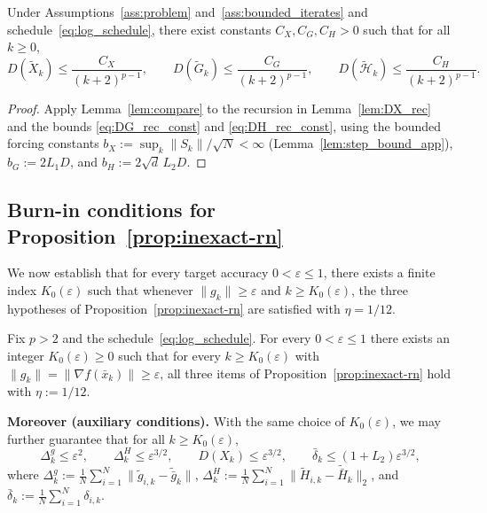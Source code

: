 \documentclass[review,onefignum,onetabnum]{siamart171218}
\begin{document}
	\begin{proposition}\label{prop:dispersion_decay}
		Under Assumptions~\ref{ass:problem} and~\ref{ass:bounded_iterates}
		and schedule~\eqref{eq:log_schedule},
		there exist constants $C_X,C_G,C_H>0$ such that for all $k\ge0$,
		\[
		D(\tilde X_k)\le \frac{C_X}{(k+2)^{p-1}},
		\qquad
		D(\tilde G_k)\le \frac{C_G}{(k+2)^{p-1}},
		\qquad
		D(\tilde{\mathcal H}_k)\le \frac{C_H}{(k+2)^{p-1}}.
		\]
	\end{proposition}
	\begin{proof}
		Apply Lemma~\ref{lem:compare} to the recursion in Lemma~\ref{lem:DX_rec} and the bounds \eqref{eq:DG_rec_const} and \eqref{eq:DH_rec_const},
		using the bounded forcing constants $b_X:=\sup_k\|S_k\|/\sqrt N<\infty$ (Lemma~\ref{lem:step_bound_app}),
		$b_G:=2L_1D$, and $b_H:=2\sqrt d\,L_2D$.
	\end{proof}
	
	\subsection{Burn-in conditions for Proposition~\ref{prop:inexact-rn}}
	
	We now establish that for every target accuracy $0<\varepsilon\le1$, there
	exists a finite index $K_0(\varepsilon)$ such that whenever
	$\|g_k\|\ge\varepsilon$ and $k\ge K_0(\varepsilon)$,
	the three hypotheses of Proposition~\ref{prop:inexact-rn} are
	satisfied with $\eta=1/12$.
	\begin{proposition}\label{prop:burnin}
		Fix $p>2$ and the schedule~\eqref{eq:log_schedule}.
		For every $0<\varepsilon\le1$ there exists an integer $K_0(\varepsilon)\ge0$ such that
		for every $k\ge K_0(\varepsilon)$ with $\|g_k\|=\|\nabla f(\bar x_k)\|\ge \varepsilon$,
		all three items of Proposition~\ref{prop:inexact-rn} hold with $\eta:=1/12$.
		
		\smallskip
		\noindent\textbf{Moreover (auxiliary conditions).}
		With the same choice of $K_0(\varepsilon)$, we may further guarantee that for all $k\ge K_0(\varepsilon)$,
		\begin{equation}\label{eq:burnin_aux_enforce}
			\Delta_k^g \le \varepsilon^2,\qquad
			\Delta_k^H \le \varepsilon^{3/2},\qquad
			D(X_k)\le \varepsilon^{3/2},\qquad
			\bar\delta_k \le (1+L_2)\varepsilon^{3/2},
		\end{equation}
		where $\Delta_k^g:=\frac1N\sum_{i=1}^N\|\tilde g_{i,k}-\tilde{\bar g}_k\|$,
		$\Delta_k^H:=\frac1N\sum_{i=1}^N\|\tilde H_{i,k}-\tilde{\bar H}_k\|_2$,
		and $\bar\delta_k:=\frac1N\sum_{i=1}^N\delta_{i,k}$.
	\end{proposition}
	
\end{document}
